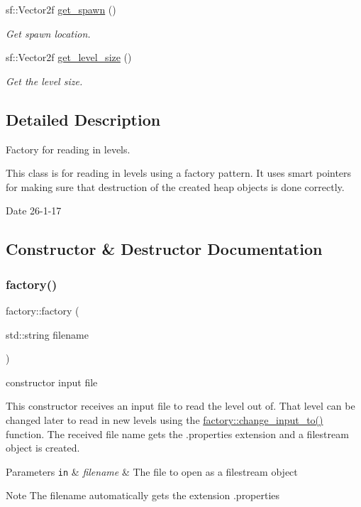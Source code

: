 \begin{DoxyCompactItemize}
sf\+::\+Vector2f \hyperlink{classfactory_a3c3a039b8f76a947267dbe659166550b}{get\+\_\+spawn} ()
\begin{DoxyCompactList}\small\item\em Get spawn location. \end{DoxyCompactList}\item 
sf\+::\+Vector2f \hyperlink{classfactory_af9bb026273b34fc032ca5ac73d457611}{get\+\_\+level\+\_\+size} ()
\begin{DoxyCompactList}\small\item\em Get the level size. \end{DoxyCompactList}\end{DoxyCompactItemize}


\subsection{Detailed Description}
Factory for reading in levels. 

This class is for reading in levels using a factory pattern. It uses smart pointers for making sure that destruction of the created heap objects is done correctly. \begin{DoxyDate}{Date}
26-\/1-\/17 
\end{DoxyDate}


\subsection{Constructor \& Destructor Documentation}
\mbox{\label{classfactory_af422815046ef8b9e95a4d8cb747fc43f}} 
\subsubsection{\texorpdfstring{factory()}{factory()}}
{\footnotesize\ttfamily factory\+::factory (\begin{DoxyParamCaption}\item[{std\+::string}]{filename }\end{DoxyParamCaption})}



constructor input file 

This constructor receives an input file to read the level out of. That level can be changed later to read in new levels using the \hyperlink{classfactory_a9e164a8fbb65188de99c39d55d7cc384}{factory\+::change\+\_\+input\+\_\+to()} function. The received file name gets the .properties extension and a filestream object is created. 
\begin{DoxyParams}[1]{Parameters}
\mbox{\tt in}  & {\em filename} & The file to open as a filestream object \\
\hline
\end{DoxyParams}
\begin{DoxyNote}{Note}
The filename automatically gets the extension .properties 
\end{DoxyNote}


